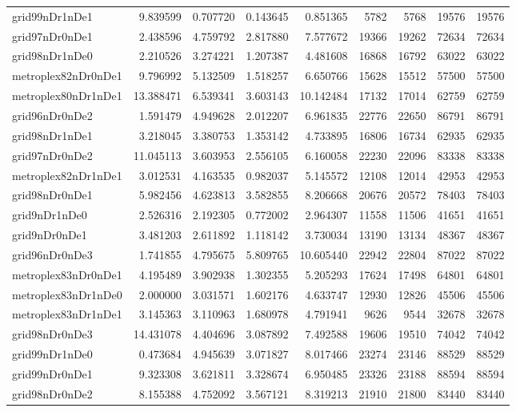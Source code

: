\begin{longtable}{|l|r|r|r|r|r|r|r|r|}
grid99nDr1nDe1 & 9.839599 & 0.707720 & 0.143645 & 0.851365 & 5782 & 5768 & 19576 & 19576 \\
grid97nDr0nDe1 & 2.438596 & 4.759792 & 2.817880 & 7.577672 & 19366 & 19262 & 72634 & 72634 \\
grid98nDr1nDe0 & 2.210526 & 3.274221 & 1.207387 & 4.481608 & 16868 & 16792 & 63022 & 63022 \\
metroplex82nDr0nDe1 & 9.796992 & 5.132509 & 1.518257 & 6.650766 & 15628 & 15512 & 57500 & 57500 \\
metroplex80nDr1nDe1 & 13.388471 & 6.539341 & 3.603143 & 10.142484 & 17132 & 17014 & 62759 & 62759 \\
grid96nDr0nDe2 & 1.591479 & 4.949628 & 2.012207 & 6.961835 & 22776 & 22650 & 86791 & 86791 \\
grid98nDr1nDe1 & 3.218045 & 3.380753 & 1.353142 & 4.733895 & 16806 & 16734 & 62935 & 62935 \\
grid97nDr0nDe2 & 11.045113 & 3.603953 & 2.556105 & 6.160058 & 22230 & 22096 & 83338 & 83338 \\
metroplex82nDr1nDe1 & 3.012531 & 4.163535 & 0.982037 & 5.145572 & 12108 & 12014 & 42953 & 42953 \\
grid98nDr0nDe1 & 5.982456 & 4.623813 & 3.582855 & 8.206668 & 20676 & 20572 & 78403 & 78403 \\
grid9nDr1nDe0 & 2.526316 & 2.192305 & 0.772002 & 2.964307 & 11558 & 11506 & 41651 & 41651 \\
grid9nDr0nDe1 & 3.481203 & 2.611892 & 1.118142 & 3.730034 & 13190 & 13134 & 48367 & 48367 \\
grid96nDr0nDe3 & 1.741855 & 4.795675 & 5.809765 & 10.605440 & 22942 & 22804 & 87022 & 87022 \\
metroplex83nDr0nDe1 & 4.195489 & 3.902938 & 1.302355 & 5.205293 & 17624 & 17498 & 64801 & 64801 \\
metroplex83nDr1nDe0 & 2.000000 & 3.031571 & 1.602176 & 4.633747 & 12930 & 12826 & 45506 & 45506 \\
metroplex83nDr1nDe1 & 3.145363 & 3.110963 & 1.680978 & 4.791941 & 9626 & 9544 & 32678 & 32678 \\
grid98nDr0nDe3 & 14.431078 & 4.404696 & 3.087892 & 7.492588 & 19606 & 19510 & 74042 & 74042 \\
grid99nDr1nDe0 & 0.473684 & 4.945639 & 3.071827 & 8.017466 & 23274 & 23146 & 88529 & 88529 \\
grid99nDr0nDe1 & 9.323308 & 3.621811 & 3.328674 & 6.950485 & 23326 & 23188 & 88594 & 88594 \\
grid98nDr0nDe2 & 8.155388 & 4.752092 & 3.567121 & 8.319213 & 21910 & 21800 & 83440 & 83440 \\

\end{longtable}

